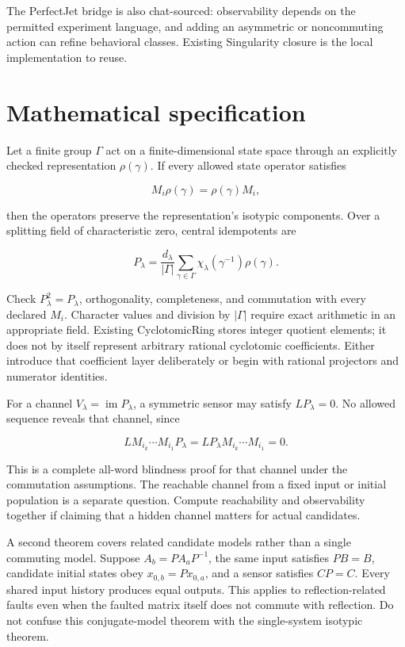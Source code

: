 \documentclass[
  11pt,
  a4paper,
]{report}
\begin{document}
The PerfectJet bridge is also chat-sourced: observability depends on the
permitted experiment language, and adding an asymmetric or noncommuting
action can refine behavioral classes. Existing Singularity closure is
the local implementation to reuse.

\hypertarget{mathematical-specification-1}{%
\section{Mathematical
specification}\label{mathematical-specification-1}}

Let a finite group \(\Gamma\) act on a finite-dimensional state space
through an explicitly checked representation \(\rho(\gamma)\). If every
allowed state operator satisfies

\[
M_i\rho(\gamma)=\rho(\gamma)M_i,
\]

then the operators preserve the representation's isotypic components.
Over a splitting field of characteristic zero, central idempotents are

\[
P_\lambda=\frac{d_\lambda}{|\Gamma|}
\sum_{\gamma\in\Gamma}\chi_\lambda(\gamma^{-1})\rho(\gamma).
\]

Check \(P_\lambda^2=P_\lambda\), orthogonality, completeness, and
commutation with every declared \(M_i\). Character values and division
by \(|\Gamma|\) require exact arithmetic in an appropriate field.
Existing CyclotomicRing stores integer quotient elements; it does not by
itself represent arbitrary rational cyclotomic coefficients. Either
introduce that coefficient layer deliberately or begin with rational
projectors and numerator identities.

For a channel \(V_\lambda=\operatorname{im}P_\lambda\), a symmetric
sensor may satisfy \(LP_\lambda=0\). No allowed sequence reveals that
channel, since

\[
LM_{i_k}\cdots M_{i_1}P_\lambda
=LP_\lambda M_{i_k}\cdots M_{i_1}=0.
\]

This is a complete all-word blindness proof for that channel under the
commutation assumptions. The reachable channel from a fixed input or
initial population is a separate question. Compute reachability and
observability together if claiming that a hidden channel matters for
actual candidates.

A second theorem covers related candidate models rather than a single
commuting model. Suppose \(A_b=PA_aP^{-1}\), the same input satisfies
\(PB=B\), candidate initial states obey \(x_{0,b}=Px_{0,a}\), and a
sensor satisfies \(CP=C\). Every shared input history produces equal
outputs. This applies to reflection-related faults even when the faulted
matrix itself does not commute with reflection. Do not confuse this
conjugate-model theorem with the single-system isotypic theorem.
\end{document}
